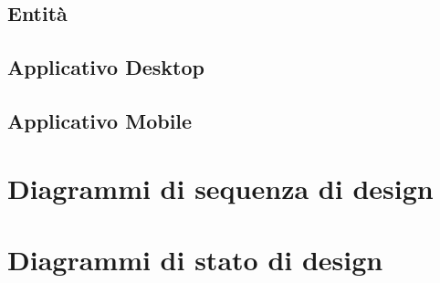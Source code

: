 \subsection{Entità}
    
     
    
    
    
\subsection{Applicativo Desktop} 
    
    
    
    
    
    
    
    
    
    
    
    
    \pagebreak
\subsection{Applicativo Mobile}
    
    
    
    
    
    
    
    
    
    
    
    
    
     
    
     
    
    

\section{Diagrammi di sequenza di design}

\section{Diagrammi di stato di design}

 
 
 